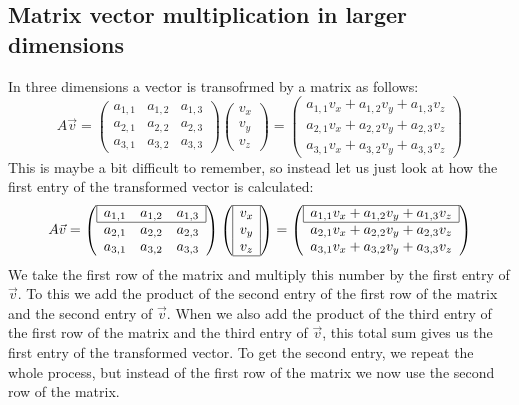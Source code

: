 \documentclass[a4paper]{report}
\begin{document}
\subsection{Matrix vector multiplication in larger dimensions}
In three dimensions a vector is transofrmed by a matrix as follows:
\begin{equation}
A\vec{v} = \begin{pmatrix} a_{1,1} & a_{1,2} & a_{1,3} \\ a_{2,1} & a_{2,2} & a_{2,3} \\ a_{3,1} & a_{3,2} & a_{3,3} \end{pmatrix} \begin{pmatrix} v_x \\ v_y \\ v_z \end{pmatrix} = \begin{pmatrix} a_{1,1}v_x + a_{1,2}v_y + a_{1,3}v_z \\ a_{2,1}v_x + a_{2,2}v_y + a_{2,3}v_z \\ a_{3,1}v_x + a_{3,2}v_y + a_{3,3}v_z\end{pmatrix}
\end{equation}
This is maybe a bit difficult to remember, so instead let us just look at how the first entry of the transformed vector is calculated:
\begin{equation}
A\vec{v} = 
\left( \begin{array}{ccc} 
\cline{1-3}
\multicolumn{1}{|c}{a_{1,1}} & a_{1,2} & \multicolumn{1}{c|}{a_{1,3}} \\ \cline{1-3} 
a_{2,1} & a_{2,2} & a_{2,3} \\ 
a_{3,1} & a_{3,2} & a_{3,3} 
\end{array} \right) 
\left(\begin{array}{|c|} \cline{1-1} v_x \\ v_y \\ v_z \\ \cline{1-1} \end{array}\right) = \left( \begin{array}{c} 
\cline{1-1} \multicolumn{1}{|c|}{a_{1,1}v_x + a_{1,2}v_y + a_{1,3}v_z} \\ \cline{1-1} a_{2,1}v_x + a_{2,2}v_y + a_{2,3}v_z \\ a_{3,1}v_x + a_{3,2}v_y + a_{3,3}v_z\end{array} \right)
\end{equation}
We take the first row of the matrix and multiply this number by the first entry of $\vec{v}$. To this we add the product of the second entry of the first row of the matrix and the second entry of $\vec{v}$. When we also add the product of the third entry of the first row of the matrix and the third entry of $\vec{v}$, this total sum gives us the first entry of the transformed vector. To get the second entry, we repeat the whole process, but instead of the first row of the matrix we now use the second row of the matrix.
\end{document}
